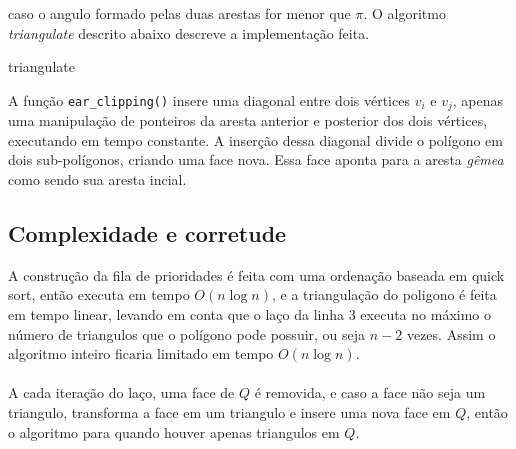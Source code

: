 \documentclass{article}
\begin{document}
caso o angulo formado pelas duas arestas for menor que $\pi$. O algoritmo
\textit{triangulate} descrito abaixo descreve a implementação feita. \\
\begin{algorithm}[H]
  \SetAlgoLined
  \label{alg1}
  \caption{triangulate}
\end{algorithm}
\hspace*{15pt}A função \texttt{ear\_clipping()} insere uma diagonal entre dois
vértices $v_i$ e $v_j$, apenas uma manipulação de ponteiros da aresta anterior
e posterior dos dois vértices, executando em tempo constante. A inserção dessa
diagonal divide o polígono em dois sub-polígonos, criando uma face nova. Essa face
aponta para a aresta \textit{gêmea} como sendo sua aresta incial.
\\
\subsection{Complexidade e corretude}
\hspace*{15pt}A construção da fila de prioridades é feita com uma ordenação
baseada em quick sort, então executa em tempo $O(n \log n)$, e a triangulação
do poligono é feita em tempo linear, levando em conta que o laço da linha 3
executa no máximo o número de triangulos que o polígono pode possuir, ou seja
$n-2$ vezes. Assim o algoritmo inteiro ficaria limitado em tempo $O(n \log n)$.
\\
\\
\hspace*{15pt}A cada iteração do laço, uma face de $Q$ é removida, e
caso a face não seja um triangulo, transforma a face em um triangulo e insere uma
nova face em $Q$, então o algoritmo para quando houver apenas triangulos em $Q$.
\newpage


\end{document}

